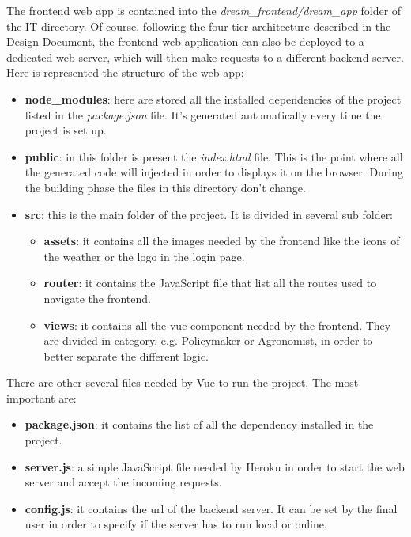 \documentclass[table, 12pt]{article}
\begin{document}
The frontend web app is contained into the \textit{dream\_frontend/dream\_app} folder of
the IT directory.
Of course, following the four tier architecture described in the Design Document,
the frontend web application can also be deployed to a dedicated web server,
which will then make requests to a different backend server.
Here is represented the structure of the web app:
\begin{itemize}
    \item \textbf{node\_modules}: here are stored all the installed dependencies of the project listed in the \textit{package.json} file.
    It's generated automatically every time the project is set up.
    \item \textbf{public}: in this folder is present the \textit{index.html} file.
    This is the point where all the generated code will injected in order to displays it on the browser.
    During the building phase the files in this directory don't change.
    \item \textbf{src}: this is the main folder of the project. It is divided in several sub folder:
    \begin {itemize}
        \item \textbf{assets}: it contains all the images needed by the frontend like the icons of the weather or the logo in the login page.
        \item \textbf{router}: it contains the JavaScript file that list all the routes used to navigate the frontend.
        \item \textbf{views}: it contains all the vue component needed by the frontend.
        They are divided in category, e.g. Policymaker or Agronomist, in order to better separate the different logic.
    \end{itemize}
\end{itemize}

There are other several files needed by Vue to run the project. The most important are:
\begin{itemize}
    \item \textbf{package.json}: it contains the list of all the dependency installed in the project.
    \item \textbf{server.js}: a simple JavaScript file needed by Heroku in order to start the web server and accept the incoming requests.
    \item \textbf{config.js}: it contains the url of the backend server.
    It can be set by the final user in order to specify if the server has to run local or online.
\end{itemize}
\end{document}
